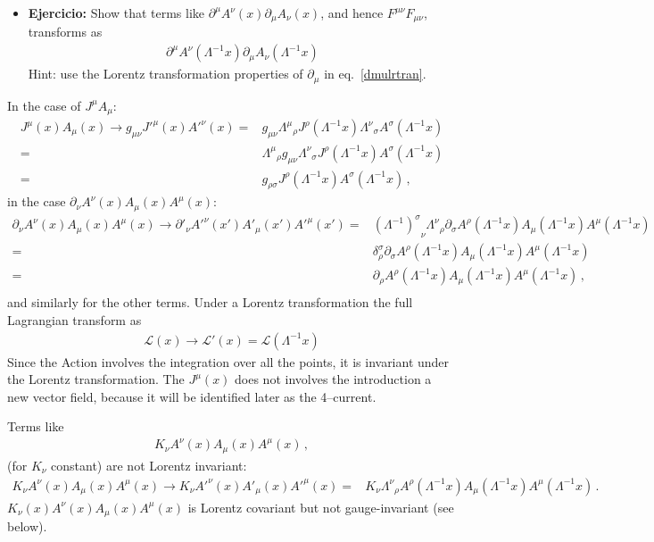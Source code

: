 \begin{itemize}
\item \textbf{Ejercicio:} Show that terms like $\partial^\mu A^\nu(x)\partial_\mu A_\nu(x)$, and hence $F^{\mu\nu}F_{\mu\nu}$, transforms as
  \begin{align}
    \partial^\mu A^\nu\left(\Lambda^{-1}x\right)\partial_\mu A_\nu\left(\Lambda^{-1}x\right)
  \end{align}
Hint: use the Lorentz transformation properties of $\partial_\mu$ in eq.~\eqref{dmulrtran}.
\end{itemize}
In the case of $J^\mu A_\mu$:
\begin{align}
  J^\mu(x)A_\mu(x)\to g_{\mu\nu}{J'}^\mu(x){A'}^\nu(x)=& g_{\mu\nu}{\Lambda^\mu}_\rho J^\rho\left(\Lambda^{-1}x\right){\Lambda^\nu}_\sigma A^\sigma\left(\Lambda^{-1}x\right)\nonumber\\
=& {\Lambda^\mu}_\rho g_{\mu\nu}{\Lambda^\nu}_\sigma J^\rho\left(\Lambda^{-1}x\right)A^\sigma\left(\Lambda^{-1}x\right)\nonumber\\
=& g_{\rho\sigma}J^\rho\left(\Lambda^{-1}x\right)A^\sigma\left(\Lambda^{-1}x\right)\,,
\end{align}
in the case $\partial_\nu A^\nu(x) A_\mu(x) A^\mu(x)$:
\begin{align}
   \partial_\nu A^\nu(x) A_\mu(x) A^\mu(x)\to {\partial'}_\nu{A'}^\nu(x') {A'}_\mu(x') {A'}^\mu(x')=& {\left(\Lambda^{-1}\right)^\sigma}_\nu{\Lambda^\nu}_\rho\partial_\sigma A^\rho\left(\Lambda^{-1}x\right) A_\mu\left(\Lambda^{-1}x\right) A^\mu\left(\Lambda^{-1}x\right)\nonumber\\
=& \delta^\sigma_\rho\partial_\sigma A^\rho\left(\Lambda^{-1}x\right) A_\mu\left(\Lambda^{-1}x\right) A^\mu\left(\Lambda^{-1}x\right)\nonumber\\
=& \partial_\rho A^\rho\left(\Lambda^{-1}x\right) A_\mu\left(\Lambda^{-1}x\right) A^\mu\left(\Lambda^{-1}x\right)\,,\nonumber\\
\end{align}
and similarly for the other terms. Under a Lorentz transformation the full Lagrangian transform as
\begin{align}
  \mathcal{L}(x)\to\mathcal{L}'(x)=\mathcal{L}(\Lambda^{-1}x) 
\end{align}
Since the Action involves the integration over all the points, it is invariant under the Lorentz transformation. The $J^\mu(x)$ does not involves the introduction a new vector field, because it will be identified later as the 4--current.


Terms like
\begin{align}
  K_\nu A^\nu(x) A_\mu(x) A^\mu(x)\,,
\end{align}
(for $K_\nu$ constant) are not Lorentz invariant:
\begin{align}
  K_\nu A^\nu(x) A_\mu(x) A^\mu(x)\to K_\nu{A'}^\nu(x) {A'}_\mu(x) {A'}^\mu(x)=& K_\nu{\Lambda^\nu}_\rho A^\rho\left(\Lambda^{-1}x\right) A_\mu\left(\Lambda^{-1}x\right) A^\mu\left(\Lambda^{-1}x\right)\,.
\end{align}
$K_\nu(x)A^\nu(x)A_\mu(x)A^\mu(x)$ is Lorentz covariant but not gauge-invariant (see below).

